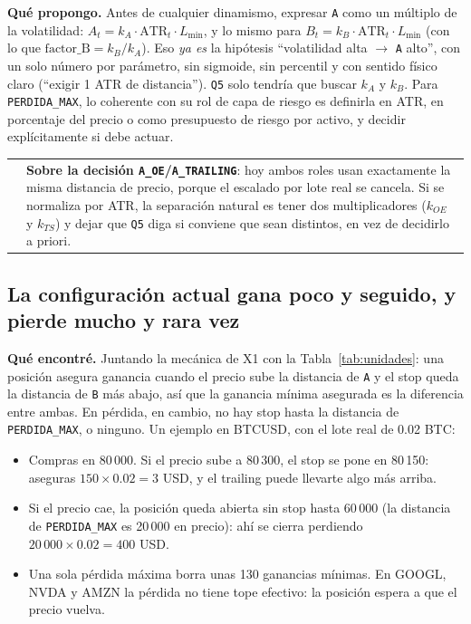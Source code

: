 \documentclass[11pt,a4paper]{article}
\makeatletter
\newcommand{\code}[1]{\texttt{\small #1}}
\newenvironment{caja}[1]{%
  \par\medskip\noindent
  \begin{tabular}{@{}p{0.4em}@{\hspace{8pt}}p{\dimexpr\linewidth-2em\relax}@{}}
  \textcolor{#1}{\rule{3pt}{1.1em}} &
}{\end{tabular}\par\medskip}
\newenvironment{nota}{\begin{caja}{cnaranja}}{\end{caja}}
\makeatother
\begin{document}
\textbf{Qué propongo.} Antes de cualquier dinamismo, expresar \code{A} como un múltiplo de la
volatilidad: $A_t = k_A \cdot \mathrm{ATR}_t \cdot L_{\min}$, y lo mismo para $B_t = k_B \cdot
\mathrm{ATR}_t \cdot L_{\min}$ (con lo que $\text{factor\_B} = k_B/k_A$). Eso \emph{ya es} la hipótesis
``volatilidad alta $\rightarrow$ \code{A} alto'', con un solo número por parámetro, sin sigmoide, sin
percentil y con sentido físico claro (``exigir 1 ATR de distancia''). \code{Q5} solo tendría que buscar
$k_A$ y $k_B$. Para \code{PERDIDA\_MAX}, lo coherente con su rol de capa de riesgo es definirla en ATR, en
porcentaje del precio o como presupuesto de riesgo por activo, y decidir explícitamente si debe actuar.

\begin{nota}
\textbf{Sobre la decisión \code{A\_OE}/\code{A\_TRAILING}}: hoy ambos roles usan exactamente la misma
distancia de precio, porque el escalado por lote real se cancela. Si se normaliza por ATR, la separación
natural es tener dos multiplicadores ($k_{OE}$ y $k_{TS}$) y dejar que \code{Q5} diga si conviene que sean
distintos, en vez de decidirlo a priori.
\end{nota}

\subsection{La configuración actual gana poco y seguido, y pierde mucho y rara vez}\label{sec:asimetria}

\textbf{Qué encontré.} Juntando la mecánica de X1 con la Tabla~\ref{tab:unidades}: una posición asegura
ganancia cuando el precio sube la distancia de \code{A} y el stop queda la distancia de \code{B} más
abajo, así que la ganancia mínima asegurada es la diferencia entre ambas. En pérdida, en cambio, no hay
stop hasta la distancia de \code{PERDIDA\_MAX}, o ninguno. Un ejemplo en BTCUSD, con el lote real de
0.02 BTC:

\begin{itemize}[leftmargin=1.2em]
  \item Compras en 80\,000. Si el precio sube a 80\,300, el stop se pone en 80\,150: aseguras
        $150 \times 0.02 = 3$ USD, y el trailing puede llevarte algo más arriba.
  \item Si el precio cae, la posición queda abierta sin stop hasta 60\,000 (la distancia de
        \code{PERDIDA\_MAX} es 20\,000 en precio): ahí se cierra perdiendo $20\,000 \times 0.02 = 400$ USD.
  \item Una sola pérdida máxima borra unas 130 ganancias mínimas. En GOOGL, NVDA y AMZN la pérdida no
        tiene tope efectivo: la posición espera a que el precio vuelva.
\end{itemize}
\end{document}
